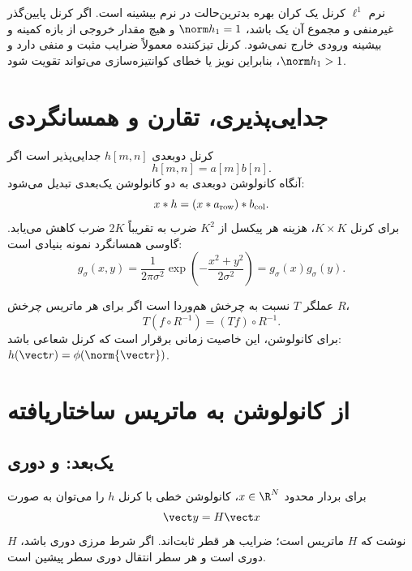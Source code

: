 \begin{keybox}
نرم \(\ell^1\) کرنل یک کران بهره بدترین‌حالت در نرم بیشینه است. اگر کرنل پایین‌گذر غیرمنفی و مجموع آن یک
باشد، \(\norm h_1=1\) و هیچ مقدار خروجی از بازه کمینه و بیشینه ورودی خارج نمی‌شود. کرنل تیزکننده معمولاً
ضرایب مثبت و منفی دارد و \(\norm h_1>1\)، بنابراین نویز یا خطای کوانتیزه‌سازی می‌تواند تقویت شود.
\end{keybox}

\section{جدایی‌پذیری، تقارن و همسانگردی}

کرنل دوبعدی \(h[m,n]\) جدایی‌پذیر است اگر
\begin{equation}
h[m,n]=a[m]b[n].
\end{equation}
آنگاه کانولوشن دوبعدی به دو کانولوشن یک‌بعدی تبدیل می‌شود:
\begin{equation}
x*h=(x*a_{\rm row})*b_{\rm col}.
\end{equation}
برای کرنل \(K\times K\)، هزینه هر پیکسل از \(K^2\) ضرب به تقریباً \(2K\) ضرب کاهش می‌یابد.
گاوسی همسانگرد نمونه بنیادی است:
\begin{equation}
g_\sigma(x,y)=\frac{1}{2\pi\sigma^2}
\exp\left(-\frac{x^2+y^2}{2\sigma^2}\right)
=g_\sigma(x)g_\sigma(y).
\end{equation}

\begin{definition}[همسانگردی]
عملگر \(T\) نسبت به چرخش هم‌وردا است اگر برای هر ماتریس چرخش \(R\)،
\begin{equation}
T(f\circ R^{-1})=(Tf)\circ R^{-1}.
\end{equation}
برای کانولوشن، این خاصیت زمانی برقرار است که کرنل شعاعی باشد: \(h(\vect r)=\phi(\norm{\vect r})\).
\end{definition}

\section{از کانولوشن به ماتریس ساختاریافته}

\subsection{یک‌بعد:  و دوری}
برای بردار محدود \(x\in\R^N\)، کانولوشن خطی با کرنل \(h\) را می‌توان به صورت
\begin{equation}
\vect y=H\vect x
\end{equation}
نوشت که \(H\) ماتریس  است؛ ضرایب هر قطر ثابت‌اند. اگر شرط مرزی دوری باشد، \(H\) دوری
 است و هر سطر انتقال دوری سطر پیشین است.

